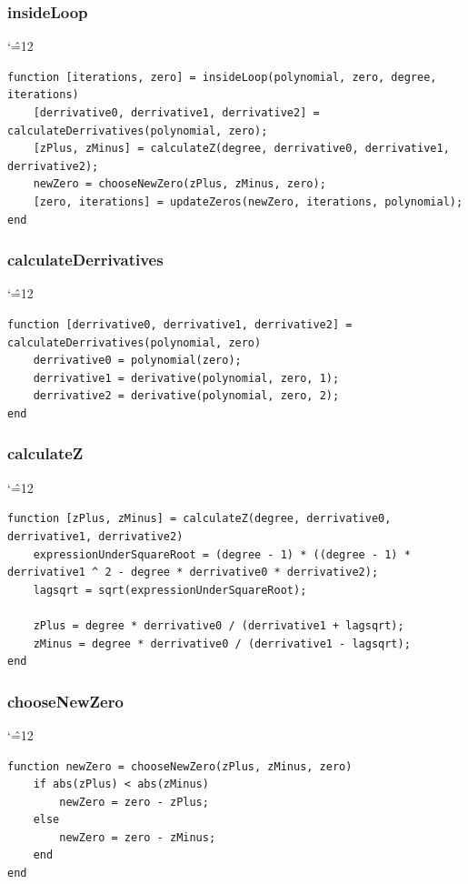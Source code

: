 \documentclass[12pt]{report}
\newenvironment{simplechar}{%
   \catcode`\^=12
}{}
\begin{document}
\subsubsection{insideLoop}
\begin{simplechar}
\begin{lstlisting}
function [iterations, zero] = insideLoop(polynomial, zero, degree, iterations)
    [derrivative0, derrivative1, derrivative2] = calculateDerrivatives(polynomial, zero);
    [zPlus, zMinus] = calculateZ(degree, derrivative0, derrivative1, derrivative2);
    newZero = chooseNewZero(zPlus, zMinus, zero);
    [zero, iterations] = updateZeros(newZero, iterations, polynomial);
end
\end{lstlisting}
\end{simplechar}

\newpage
\subsubsection{calculateDerrivatives}
\begin{simplechar}
\begin{lstlisting}
function [derrivative0, derrivative1, derrivative2] = calculateDerrivatives(polynomial, zero)
    derrivative0 = polynomial(zero);
    derrivative1 = derivative(polynomial, zero, 1);
    derrivative2 = derivative(polynomial, zero, 2);
end
\end{lstlisting}
\end{simplechar}

\subsubsection{calculateZ}
\begin{simplechar}
\begin{lstlisting}
function [zPlus, zMinus] = calculateZ(degree, derrivative0, derrivative1, derrivative2)
    expressionUnderSquareRoot = (degree - 1) * ((degree - 1) * derrivative1 ^ 2 - degree * derrivative0 * derrivative2);
    lagsqrt = sqrt(expressionUnderSquareRoot);

    zPlus = degree * derrivative0 / (derrivative1 + lagsqrt);
    zMinus = degree * derrivative0 / (derrivative1 - lagsqrt);
end
\end{lstlisting}
\end{simplechar}

\subsubsection{chooseNewZero}
\begin{simplechar}
\begin{lstlisting}
function newZero = chooseNewZero(zPlus, zMinus, zero)
    if abs(zPlus) < abs(zMinus)
        newZero = zero - zPlus;
    else
        newZero = zero - zMinus;
    end
end
\end{lstlisting}
\end{simplechar}
\end{document}
